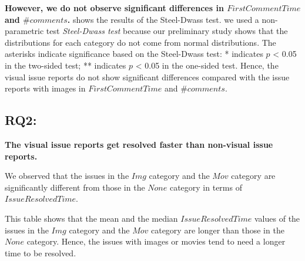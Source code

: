 \textbf{However, we do not observe 
significant differences in $FirstCommentTime$ and $\#comments$.}
 shows the results of 
the Steel-Dwass test. 
we used a non-parametric test \textit{Steel-Dwass test}
because our preliminary study shows that 
the distributions for each category do not 
come from normal distributions.
The asterisks indicate significance based on 
the Steel-Dwass test: * indicates $p$ < 0.05 in 
the two-sided test; 
** indicates $p$ < 0.05 in the one-sided test. 
Hence, the visual issue reports do not show 
significant differences compared with 
the issue reports with images in 
$FirstCommentTime$ and $\#comments$.

{
}


\subsection{RQ2: \RQtwo{}}


\textbf{The visual issue reports get resolved faster than non-visual issue reports. }

We observed that the issues in the $Img$ category and 
the $Mov$ category are significantly different from those 
in the $None$ category in terms of $IssueResolvedTime$. 

This table shows that 
the mean and the median $IssueResolvedTime$ values of 
the issues in the $Img$ category and the $Mov$ category are 
longer than those in the $None$ category. 
Hence, the issues with images or movies tend to need 
a longer time to be resolved. 

